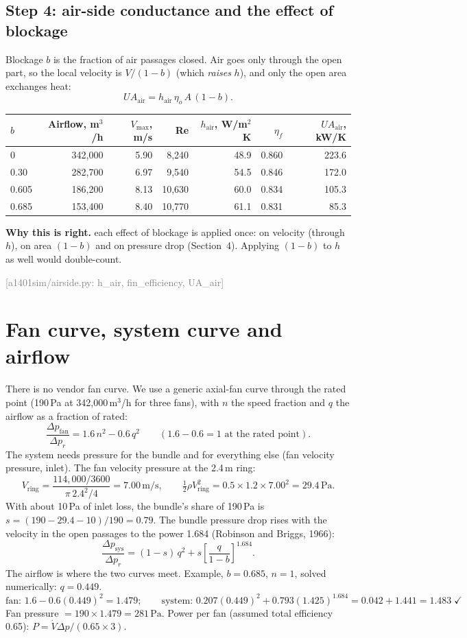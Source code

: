 \documentclass[11pt,a4paper]{article}
\newcommand{\unit}[1]{\ensuremath{\,\mathrm{#1}}}
\newcommand{\src}[1]{\textcolor{gray}{\small[#1]}}
\newcommand{\why}[1]{\par\noindent\textbf{Why this is right.} #1\par}
\begin{document}
\subsection*{Step 4: air-side conductance and the effect of blockage}
Blockage $b$ is the fraction of air passages closed. Air goes only through the open part, so the local velocity is $V/(1-b)$ (which \emph{raises} $h$), and only the open area exchanges heat:
\[
UA_\text{air} = h_\text{air}\,\eta_o\,A\,(1-b).
\]
\begin{center}\small\setlength{\tabcolsep}{4pt}\begin{tabular}{lrrrrrr}
\toprule
$b$ & Airflow, m$^3$/h & $V_\text{max}$, m/s & Re & $h_\text{air}$, W/m$^2$K & $\eta_f$ & $UA_\text{air}$, kW/K\\\midrule
0 & 342{,}000 & 5.90 & 8{,}240 & 48.9 & 0.860 & 223.6\\
0.30 & 282{,}700 & 6.97 & 9{,}540 & 54.5 & 0.846 & 172.0\\
0.605 & 186{,}200 & 8.13 & 10{,}630 & 60.0 & 0.834 & 105.3\\
0.685 & 153{,}400 & 8.40 & 10{,}770 & 61.1 & 0.831 & 85.3\\
\bottomrule\end{tabular}\end{center}
\why{each effect of blockage is applied once: on velocity (through $h$), on area $(1-b)$ and on pressure drop (Section~4). Applying $(1-b)$ to $h$ as well would double-count.}
\src{a1401sim/airside.py: h\_air, fin\_efficiency, UA\_air}

\section{Fan curve, system curve and airflow}

There is no vendor fan curve. We use a generic axial-fan curve through the rated point (190\,Pa at 342{,}000\,m$^3$/h for three fans), with $n$ the speed fraction and $q$ the airflow as a fraction of rated:
\[
\frac{\Delta p_\text{fan}}{\Delta p_r} = 1.6\,n^2 - 0.6\,q^2 \qquad (1.6-0.6 = 1 \text{ at the rated point}).
\]
The system needs pressure for the bundle and for everything else (fan velocity pressure, inlet). The fan velocity pressure at the 2.4\,m ring:
\[
V_\text{ring} = \frac{114{,}000/3600}{\pi\,2.4^2/4} = 7.00\unit{m/s},\qquad \tfrac12\rho V_\text{ring}^2 = 0.5\times1.2\times7.00^2 = 29.4\unit{Pa}.
\]
With about 10\,Pa of inlet loss, the bundle's share of 190\,Pa is $s=(190-29.4-10)/190 = 0.79$. The bundle pressure drop rises with the velocity in the open passages to the power 1.684 (Robinson and Briggs, 1966):
\[
\frac{\Delta p_\text{sys}}{\Delta p_r} = (1-s)\,q^2 + s\left[\frac{q}{1-b}\right]^{1.684}.
\]
The airflow is where the two curves meet. Example, $b=0.685$, $n=1$, solved numerically: $q = 0.449$.
\[
\text{fan: } 1.6-0.6(0.449)^2 = 1.479;\qquad
\text{system: } 0.207(0.449)^2 + 0.793(1.425)^{1.684} = 0.042+1.441 = 1.483 \;\checkmark
\]
Fan pressure $=190\times1.479 = 281\unit{Pa}$. Power per fan (assumed total efficiency 0.65): $P=\dot V\Delta p/(0.65\times3)$.
\end{document}

